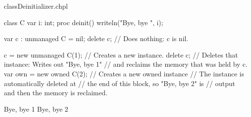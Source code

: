 \begin{chapelexample}{classDeinitializer.chpl}
\begin{chapel}
class C {
  var i: int;
  proc deinit() { writeln("Bye, bye ", i); }
}

var c : unmanaged C = nil;
delete c;              // Does nothing: c is nil.

c = new unmanaged C(1); // Creates a new instance.
delete c;               // Deletes that instance: Writes out "Bye, bye 1"
                        // and reclaims the memory that was held by c.
{
  var own = new owned C(2); // Creates a new owned instance
                            // The instance is automatically deleted at
                            // the end of this block, so "Bye, bye 2" is
                            // output and then the memory is reclaimed.
}
\end{chapel}
\begin{chapeloutput}
Bye, bye 1
Bye, bye 2
\end{chapeloutput}
\end{chapelexample}
